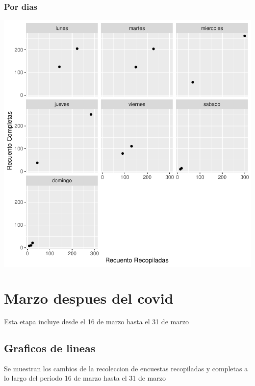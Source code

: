 \documentclass{article}
\begin{document}
\subsubsection{Por dias}

\includegraphics{seguimento2-054}

\section{Marzo despues del covid}
Esta etapa incluye desde el 16 de marzo hasta el 31 de marzo

\subsection{Graficos de lineas}
Se muestran los cambios de la recoleccion de encuestas recopiladas y completas a lo largo del periodo 16 de marzo hasta el 31 de marzo
\end{document}
